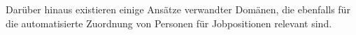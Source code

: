 Darüber hinaus existieren einige Ansätze verwandter Domänen, die ebenfalls für die automatisierte Zuordnung von Personen für Jobpositionen relevant sind.



